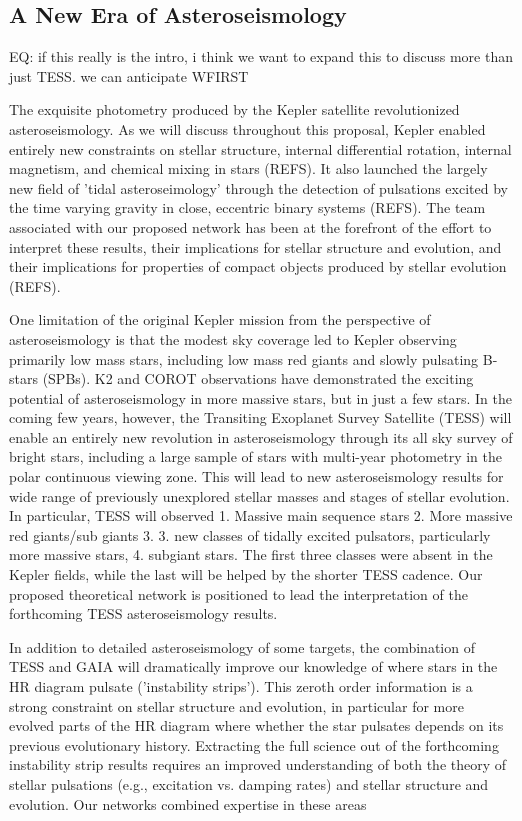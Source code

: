 {\color{blue}
\subsection{A New Era of Asteroseismology}

EQ:  if this really is the intro, i think we want to expand this to discuss more than just TESS. we can anticipate WFIRST

The exquisite photometry produced by the Kepler satellite revolutionized asteroseismology.   As we will discuss throughout this proposal, Kepler enabled entirely new constraints on stellar structure, internal differential rotation, internal magnetism, and chemical mixing in stars (REFS).  It also launched the largely new field of 'tidal asteroseimology' through the detection of pulsations excited by the time varying gravity in close, eccentric binary systems (REFS). The team associated with our proposed network has been at the forefront of the effort to interpret these results, their implications for stellar structure and evolution, and their implications for properties of compact objects produced by stellar evolution (REFS).   

One limitation of the original Kepler mission from the perspective of asteroseismology is that the modest sky coverage led to Kepler observing primarily low mass stars, including low mass red giants and slowly pulsating B-stars (SPBs).  K2 and COROT observations have demonstrated the exciting potential of asteroseismology in more massive stars, but in just a few stars.   In the coming few years, however, the Transiting Exoplanet Survey Satellite (TESS) will enable an entirely new revolution in asteroseismology through its all sky survey of bright stars, including a large sample of stars with multi-year photometry in the polar continuous viewing zone.   This will lead to new asteroseismology results for wide range of previously unexplored stellar masses and stages of stellar evolution.   In particular, TESS will observed 1.  Massive main sequence stars 2. More massive red giants/sub giants 3. 3.  new classes of tidally excited pulsators, particularly more massive stars, 4. subgiant stars.   The first three classes were absent in the Kepler fields, while the last will be helped by the shorter TESS cadence.   Our proposed theoretical network is positioned to lead the interpretation of the forthcoming TESS asteroseismology results.  

In addition to detailed asteroseismology of some targets, the combination of TESS and GAIA will dramatically improve our knowledge of where stars in the HR diagram pulsate ('instability strips').   This zeroth order information is  a strong constraint on stellar structure and evolution, in particular for more evolved parts of the HR diagram where whether the star pulsates depends on its previous evolutionary history.  Extracting the full science out of the forthcoming instability strip results requires an improved understanding of both the theory of stellar pulsations (e.g., excitation vs. damping rates) and stellar structure and evolution.   Our networks combined expertise in these areas




}